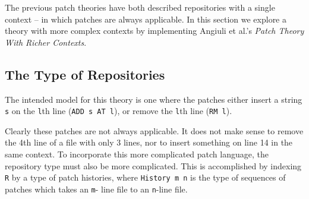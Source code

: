 The previous patch theories have both described repositories with a single context --
in which patches are always applicable. In this section we explore a theory with more
complex contexts by implementing Angiuli et al.'s \emph{Patch Theory With Richer Contexts}.

\subsection{The Type of Repositories}
The intended model for this theory is one where the patches either insert a string \texttt{s} on the
\texttt{l}th line (\texttt{ADD s AT l}), or remove the \texttt{l}th line (\texttt{RM l}).

Clearly these patches are not always applicable. It does not make sense to remove the 4th line of a file
with only 3 lines, nor to insert something on line 14 in the same context.
To incorporate this more complicated patch language, the repository type must also be more complicated.
This is accomplished by indexing \texttt{R} by a type
of patch histories, where \texttt{History~m~n} is the type of sequences of patches which takes an \texttt{m}-
line file to an \texttt{n}-line file.
